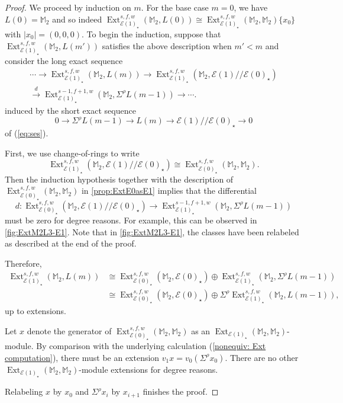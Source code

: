 \documentclass{amsart}
\theoremstyle{plain}
\numberwithin{equation}{section}
\numberwithin{figure}{section}
\DeclareMathOperator{\Ext}{Ext}
\newcommand{\mM}{{\mathbb M}}
\newcommand{\cE}{{\mathcal E}}
\newcommand{\0}{\langle 0 \rangle }
\begin{document}
\begin{proof} We proceed by induction on $m$. For the base case $m=0$, we have $L(0) = \mM_{2}$ and so indeed $\Ext_{\cE(1)_{\star}}^{s,f,w}(\mM_{2}, L(0)) \cong \Ext_{\cE(1)_{\star}}^{s,f,w}(\mM_{2}, \mM_{2})\{x_{0}\}$ with $|x_{0}| = (0,0,0)$. To begin the induction, suppose that $\Ext_{\cE(1)_{\star}}^{s,f,w}(\mM_{2}, L(m') )$ satisfies the above description when $m' < m$ and consider the long exact sequence 
\begin{align*}\label{eqn: les for IH on m}
   \cdots \rightarrow \Ext_{\cE(1)_{\star}}^{s,f,w}(\mM_{2}, L(m) ) \rightarrow  \Ext_{\cE(1)_{\star}}^{s,f,w}(\mM_{2}, \cE(1)//\cE(0)_{\star} ) \\
   \xrightarrow{d} \Ext_{\cE(1)_{\star}}^{s-1,f+1,w}(\mM_{2}, \Sigma^{\rho}L(m-1) ) \rightarrow \cdots.
\end{align*}
induced by the short exact sequence 
\[
 0 \to \Sigma^\rho L(m - 1) \to L(m) \to \cE(1)// \cE(0)_\star \to 0
\]
of (\ref{eq:ses}).

First, we use change-of-rings to write 
\[ 
\Ext_{\cE(1)_{\star}}^{s,f,w}(\mM_{2}, \cE(1)//\cE(0)_{\star} ) \cong \Ext_{\cE(0)_{\star}}^{s,f,w}(\mM_{2}, \mM_{2} ).
\]
Then the induction hypothesis together with the description of $\Ext_{\cE(0)_{\star}}^{s,f,w}(\mM_{2}, \mM_{2} )$ in \cref{prop:ExtE0asE1} implies that the differential
\[
d: \Ext_{\cE(0)_{\star}}^{s,f,w}(\mM_{2},\cE(1)//\cE(0)_{\star} ) \rightarrow \Ext_{\cE(1)_{\star}}^{s-1,f+1,w}(\mM_{2}, \Sigma^{\rho}L(m-1) )
\] must be zero for degree reasons. For example, this can be observed in \cref{fig:ExtM2L3-E1}. Note that in \cref{fig:ExtM2L3-E1}, the classes have been relabeled as described at the end of the proof.

Therefore, 
\begin{align*}
    \Ext_{\cE(1)_{\star}}^{s,f,w}(\mM_{2}, L(m) ) & \cong \Ext_{\cE(0)_{\star}}^{s,f,w}(\mM_{2},\cE(0)_{\star} ) \oplus \Ext_{\cE(1)_{\star}}^{s,f,w}(\mM_{2}, \Sigma^{\rho}L(m-1) ) \\
    & \cong \Ext_{\cE(0)_{\star}}^{s,f,w}(\mM_{2},\cE(0)_{\star} ) \oplus \Sigma^{\rho} \Ext_{\cE(1)_{\star}}^{s,f,w}(\mM_{2}, L(m-1) ),
\end{align*}
up to extensions. 

Let $x$ denote the generator of $\Ext_{\cE(0)_{\star}}^{s,f,w}(\mM_{2},\mM_{2} )$ as an $\Ext_{\cE(1)_\star}(\mM_2, \mM_2)$-module. By comparison with the underlying calculation (\cref{nonequiv: Ext computation}), there must be an extension $v_1 x = v_0 (\Sigma^\rho x_0).$ There are no other $\Ext_{\cE(1)_{\star}}(\mM_{2}, \mM_{2})$-module extensions for degree reasons.

Relabeling $x$ by $x_{0}$ and $\Sigma^{\rho}x_{i}$ by $x_{i+1}$ finishes the proof.
\end{proof}
\end{document}
